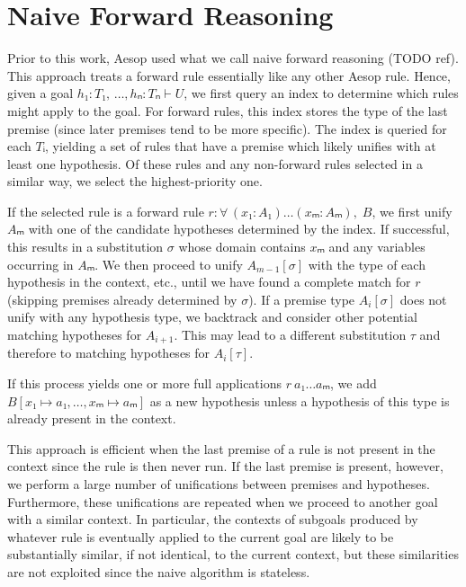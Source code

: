 \documentclass[runningheads]{llncs}
\newcommand{\jcom}[1]{{\color{orange}{Jannis: #1}} }
\newcommand{\All}[2]{\ensuremath{\forall\, #1,\; #2}}
\begin{document}
\section{Naive Forward Reasoning}

Prior to this work, Aesop used what we call naive forward reasoning (TODO ref).
This approach treats a forward rule essentially like any other Aesop rule.
Hence, given a goal $h₁ : T₁,\, \dots, hₙ : Tₙ ⊢ U$, we first query an index to determine which rules might apply to the goal.
For forward rules, this index stores the type of the last premise (since later premises tend to be more specific).
The index is queried for each $Tᵢ$, yielding a set of rules that have a premise which likely unifies with at least one hypothesis.
Of these rules and any non-forward rules selected in a similar way, we select the highest-priority one.

If the selected rule is a forward rule $r : \All{(x₁ : A₁) \dots (xₘ : Aₘ)}{B}$, we first unify $Aₘ$ with one of the candidate hypotheses determined by the index.
If successful, this results in a substitution $σ$ whose domain contains $xₘ$ and any variables occurring in $Aₘ$.
We then proceed to unify $A_{m-1}[σ]$ with the type of each hypothesis in the context, etc., until we have found a complete match for $r$ (skipping premises already determined by $σ$).
If a premise type $A_{i}[σ]$ does not unify with any hypothesis type, we backtrack and consider other potential matching hypotheses for $A_{i+1}$.
This may lead to a different substitution $τ$ and therefore to matching hypotheses for $A_{i}[τ]$.

If this process yields one or more full applications $r~a₁ \dots aₘ$, we add $B[x₁ ↦ a₁, \dots, xₘ ↦ aₘ]$ as a new hypothesis unless a hypothesis of this type is already present in the context.

\jcom{Add example?}

This approach is efficient when the last premise of a rule is not present in the context since the rule is then never run.
If the last premise is present, however, we perform a large number of unifications between premises and hypotheses.
Furthermore, these unifications are repeated when we proceed to another goal with a similar context.
In particular, the contexts of subgoals produced by whatever rule is eventually applied to the current goal are likely to be substantially similar, if not identical, to the current context, but these similarities are not exploited since the naive algorithm is stateless.
\end{document}
